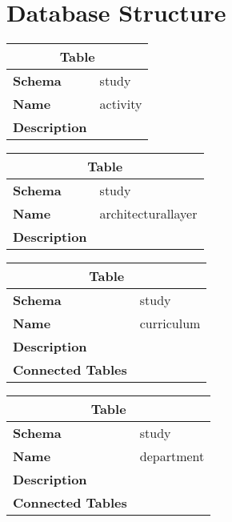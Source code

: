 \section{Database Structure}

\begin{table}[H]
	\renewcommand{\arraystretch}{2}
	\centering
	\begin{tabular}{|p{}|p{}|}
		\hline
		\multicolumn{2}{|c|}{\textbf{Table}} \\ \hline
		\textbf{Schema}               & study \\ \hline
		\textbf{Name}                 & activity \\ \hline
		\textbf{Description}          &      \\ \hline
	\end{tabular}
\end{table}

\begin{table}[H]
	\renewcommand{\arraystretch}{2}
	\centering
	\begin{tabular}{|p{}|p{}|}
		\hline
		\multicolumn{2}{|c|}{\textbf{Table}} \\ \hline
		\textbf{Schema}               & study \\ \hline
		\textbf{Name}                 & architecturallayer \\ \hline
		\textbf{Description}          &      \\ \hline
	\end{tabular}
\end{table}

\begin{table}[H]
	\renewcommand{\arraystretch}{2}
	\centering
	\begin{tabular}{|p{}|p{}|}
		\hline
		\multicolumn{2}{|c|}{\textbf{Table}} \\ \hline
		\textbf{Schema}               & study \\ \hline
		\textbf{Name}                 & curriculum \\ \hline
		\textbf{Description}          &      \\ \hline
		\textbf{Connected Tables}     &      \\ \hline
	\end{tabular}
\end{table}

\begin{table}[H]
	\renewcommand{\arraystretch}{2}
	\centering
	\begin{tabular}{|p{}|p{}|}
		\hline
		\multicolumn{2}{|c|}{\textbf{Table}} \\ \hline
		\textbf{Schema}               & study \\ \hline
		\textbf{Name}                 & department \\ \hline
		\textbf{Description}          &      \\ \hline
		\textbf{Connected Tables}     &      \\ \hline
	\end{tabular}
\end{table}

